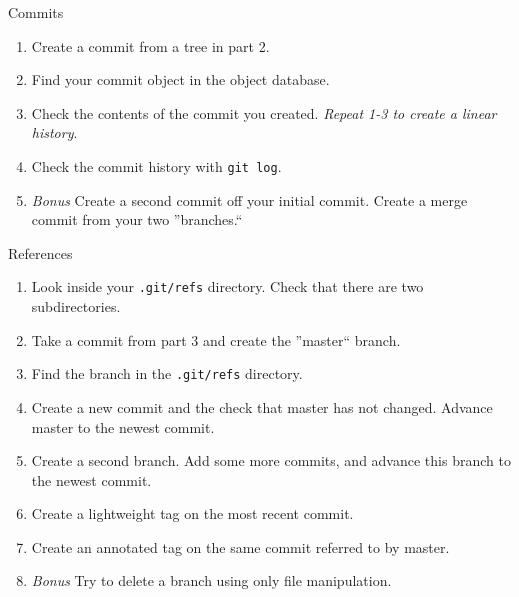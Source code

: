 \documentclass[a4paper]{article}
\begin{document}
\vspace{0.2in}

{\large Commits}

\begin{enumerate}
  \item Create a commit from a tree in part 2.
  \item Find your commit object in the object database.
  \item Check the contents of the commit you created. \textit{Repeat 1-3 to
          create a linear history}.
  \item Check the commit history with \texttt{git log}.
  \item \textit{Bonus} Create a second commit off your initial commit. Create a
		  merge commit from your two ''branches.``
\end{enumerate}

\vspace{0.2in}

{\large References}

\begin{enumerate}
  \item Look inside your \texttt{.git/refs} directory. Check that there are two
		  subdirectories.
  \item Take a commit from part 3 and create the ''master`` branch.
  \item Find the branch in the \texttt{.git/refs} directory.
  \item Create a new commit and the check that master has not changed. Advance
		  master to the newest commit.
  \item Create a second branch. Add some more commits, and advance this branch
		  to the newest commit.
  \item Create a lightweight tag on the most recent commit.
  \item Create an annotated tag on the same commit referred to by master.
  \item \textit{Bonus} Try to delete a branch using only file manipulation.
\end{enumerate}
\end{document}
